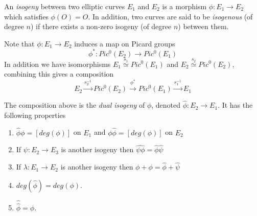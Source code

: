 \begin{mydef}
 An \emph{isogeny} between two elliptic curves $E_1$ and $E_2$ is a morphism $\phi: E_1 \rightarrow E_2$
which satisfies $\phi(O) = O$. In addition, two curves are said to be \emph{isogenous} (of degree $n$) 
if there exists a non-zero isogeny (of degree $n$) between them.
\end{mydef}

Note that $\phi: E_1 \rightarrow E_2$ induces a map on Picard groups
$$\phi^*: Pic^0(E_2) \rightarrow Pic^0(E_1)$$
In addition we have isomorphisms $E_1 \overset{s_1}{\simeq} Pic^0(E_1)$ and 
$E_2 \overset{s_2}{\simeq} Pic^0(E_2)$, combining this gives a composition
$$ E_2 \overset{s_2^{-1}}{\rightarrow} Pic^0(E_2) \overset{\phi^*}{\rightarrow} Pic^0(E_1)
\overset{s_1^{-1}}{\rightarrow} E_1 $$

\begin{prop}
 The composition above is the \emph{dual isogeny} of $\phi$, denoted $\widehat{\phi}: E_2 \rightarrow E_1$.
It has the following properties 
\begin{enumerate}
 \item $\widehat{\phi}\phi = [deg(\phi)]$ on $E_1$ and $\phi\widehat{\phi} = [deg(\phi)]$ on $E_2$
 \item If $\psi: E_2 \rightarrow E_3$ is another isogeny then $\widehat{\psi \phi} = \widehat{\phi}\widehat{\psi}$
 \item If $\lambda: E_1 \rightarrow E_2$ is another isogeny then $\widehat{\phi+\phi} = \widehat{\phi}+\widehat{\psi}$
 \item $deg(\widehat{\phi}) = deg(\phi)$.
 \item $\widehat{\widehat{\phi}} = \phi$.
\end{enumerate}

\end{prop}
